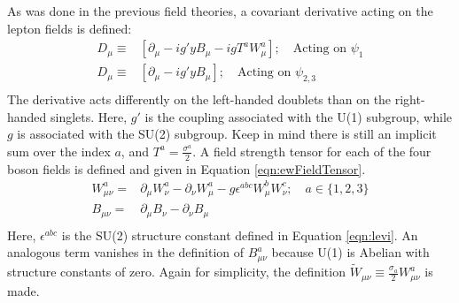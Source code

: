 As was done in the previous field theories, a covariant derivative acting on the lepton fields is defined:
\begin{equation}\begin{split}\label{eqn:ewCovDeriv}
        D_\mu\equiv& [\partial_\mu-ig'yB_\mu-igT^aW_\mu^a] ; \quad\text{Acting on }\psi_1\\
        D_\mu\equiv& [\partial_\mu-ig'yB_\mu]; \quad\text{Acting on }\psi_{2,3} \\
\end{split}\end{equation}
The derivative acts differently on the left-handed doublets than on the right-handed singlets.
Here, $g'$ is the coupling associated with the U(1) subgroup, while $g$ is associated with the SU(2) subgroup.
Keep in mind there is still an implicit sum over the index $a$, and $T^a=\frac{\sigma^a}{2}$.
A field strength tensor for each of the four boson fields is defined and given in Equation \ref{eqn:ewFieldTensor}.
\begin{equation}\begin{split}\label{eqn:ewFieldTensor}
W^a_{\mu\nu} =& \partial_\mu W^a_\nu-\partial_\nu W^a_\mu-g\epsilon^{abc}W^b_\mu W^c_\nu; \quad a\in\{1,2,3\} \\
B_{\mu\nu} =& \partial_\mu B_\nu-\partial_\nu B_\mu \\
\end{split}\end{equation}
Here, $\epsilon^{abc}$ is the SU(2) structure constant defined in Equation \ref{eqn:levi}.
An analogous term vanishes in the definition of $B^a_{\mu\nu}$ because U(1) is Abelian with structure constants of zero.
Again for simplicity, the definition $\widetilde{W}_{\mu\nu}\equiv\frac{\sigma_a}{2}W_{\mu\nu}^a$ is made.


